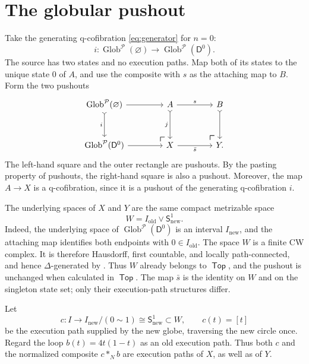 \documentclass[12pt,a4paper]{amsart}
\newcommand{\Top}{\mathop{\mathsf{Top}}}
\newcommand{\Pcat}{\mathcal P}
\newcommand{\Glob}{\operatorname{Glob}^{\Pcat}}
\newcommand{\cocartesian}{\arrow[lu, phantom, "\ulcorner"{font=\Large}, pos=0]}
\theoremstyle{definition}
\begin{document}
\section{The globular pushout}
\label{sec:4}

Take the generating q-cofibration \eqref{eq:generator} for \(n=0\):
\begin{equation}\label{eq:i}
 i:\Glob(\varnothing)\longrightarrow\Glob(\mathsf{D}^0).
\end{equation}
The source has two states and no execution paths.  Map both of its states to the unique state \(0\) of \(A\), and use the composite with \(s\) as the attaching map to \(B\).  Form the two pushouts
\[
\begin{tikzcd}[column sep=4.2em,row sep=3em]
 \Glob(\varnothing) \arrow[r] \arrow[d,"i"',rightarrowtail]
   & A \arrow[d,rightarrowtail,"j"'] \arrow[r,"s"] & B \arrow[d,rightarrowtail] \\
 \Glob(\mathsf{D}^0) \arrow[r] & \cocartesian X \arrow[r,"\bar s"'] & \cocartesian Y .
\end{tikzcd}
\]
The left-hand square and the outer rectangle are pushouts. By the pasting property of pushouts, the right-hand square is also a pushout.  Moreover, the map \(A\to X\) is a q-cofibration, since it is a pushout of the generating q-cofibration \(i\).

The underlying spaces of \(X\) and \(Y\) are the same compact metrizable space
\begin{equation}\label{eq:wedge}
 W=I_{\mathrm{old}}\vee \mathsf{S}^1_{\mathrm{new}}.
\end{equation}
Indeed, the underlying space of \(\Glob(\mathsf{D}^0)\) is an interval \(I_{\mathrm{new}}\), and the attaching map identifies both endpoints with \(0\in I_{\mathrm{old}}\). The space \(W\) is a finite CW complex.  It is therefore Hausdorff, first countable, and locally path-connected, and hence \(\Delta\)-generated by \cite[Proposition~3.11]{MR3270173}. Thus \(W\) already belongs to \(\Top\), and the pushout is unchanged when calculated in \(\Top\). The map \(\bar s\) is the identity on \(W\) and on the singleton state set; only their execution-path structures differ.

Let
\[
 c: I\longrightarrow I_{\mathrm{new}}/(0\sim 1) \cong \mathsf{S}^1_{\mathrm{new}}\subset W,
 \qquad c(t)=[t]
\]
be the execution path supplied by the new globe, traversing the new circle once.  Regard the loop \(b(t)=4t(1-t)\) as an old execution path.  Thus both \(c\) and the normalized composite \(c*_N b\) are execution paths of \(X\), as well as of \(Y\).
\end{document}
